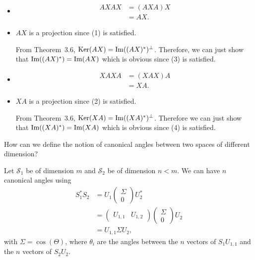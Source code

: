 \begin{solution}
	\begin{itemize}
		\item
		\begin{align*}
		AXAX
		& = (AXA)X\\
		& = AX.
		\end{align*}
		\item
		$AX$ is a projection since (1) is satisfied.
		
		From Theorem~3.6, $\operatorname{Ker}(AX) = \operatorname{Im}((AX)^*)^\perp$.
		Therefore, we can just show that $\operatorname{Im}((AX)^*) = \operatorname{Im}(AX)$ which is obvious
		since (3) is satisfied.
		\item
		\begin{align*}
		XAXA
		& = (XAX)A\\
		& = XA.
		\end{align*}
		\item
		$XA$ is a projection since (2) is satisfied.
		
		From Theorem~3.6, $\operatorname{Ker}(XA) = \operatorname{Im}((XA)^*)^\perp$.
		Therefore we can just show that $\operatorname{Im}((XA)^*) = \operatorname{Im}(XA)$ which is obvious
		since (4) is satisfied.
	\end{itemize}
\end{solution}

How can we define the notion of canonical angles between two spaces of different dimension?


\begin{solution}
	Let $\mathcal{S}_1$ be of dimension $m$ and $\mathcal{S}_2$ be of dimension $n < m$.
	We can have $n$ canonical angles using
	\begin{align*}
	S_1^*S_2
	& = U_1
	\begin{pmatrix}
	\Sigma\\0
	\end{pmatrix}
	U_2^*\\
	& =
	\begin{pmatrix}
	U_{1,1} & U_{1,2}
	\end{pmatrix}
	\begin{pmatrix}
	\Sigma\\0
	\end{pmatrix}
	U_2\\
	& = U_{1,1} \Sigma U_2,
	\end{align*}
	with $\Sigma = \cos(\Theta)$, where $\theta_i$ are the angles between the $n$ vectors of $S_1U_{1,1}$
	and the $n$ vectors of $S_2U_2$.
\end{solution}

